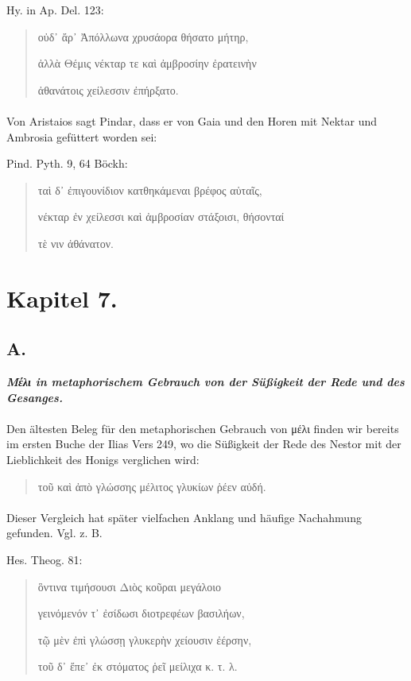 \documentclass[a4paper, 11pt, oneside]{article}
\begin{document}
Hy. in Ap. Del. 123:
\begin{quotation}\large
οὐδ᾽ ἄρ᾽ Ἀπόλλωνα χρυσάορα θήσατο μήτηρ,

ἀλλὰ Θέμις νέκταρ τε καὶ ἀμβροσίην ἐρατεινὴν

ἀθανάτοις χείλεσσιν ἐπήρξατο.
\end{quotation}
\paragraph{}
Von Aristaios sagt Pindar, dass er von Gaia und den Horen mit Nektar und Ambrosia gefüttert worden sei:

Pind. Pyth. 9, 64 Böckh:
\begin{quotation}\large
ταὶ δ᾽ ἐπιγουνίδιον κατθηκάμεναι βρέφος αὑταῖς,

νέκταρ ἐν χείλεσσι καὶ ἀμβροσίαν στάξοισι, θήσονταί

τὲ νιν ἀθάνατον.
\end{quotation}
\paragraph{}
\clearpage
\section{Kapitel 7.}
\subsection{A.}
\begin{center}
\textbf{\emph{Μέλι in metaphorischem Gebrauch von der Süßigkeit der Rede und des Gesanges.}}
\end{center}
\paragraph{}
Den ältesten Beleg für den metaphorischen Gebrauch von μέλι finden wir bereits im ersten Buche der Ilias Vers 249, wo die Süßigkeit der Rede des Nestor mit der Lieblichkeit des Honigs verglichen wird:
\begin{quotation}\large
τοῦ καὶ ἀπὸ γλώσσης μέλιτος γλυκίων ῥέεν αὐδή.
\end{quotation}
\paragraph{}
Dieser Vergleich hat später vielfachen Anklang und häufige Nachahmung gefunden. Vgl. z. B.

Hes. Theog. 81:
\begin{quotation}\large
ὃντινα τιμήσουσι Διὸς κοῦραι μεγάλοιο

γεινόμενόν τ᾽ ἐσίδωσι διοτρεφέων βασιλήων,

τῷ μὲν ἐπὶ γλώσσῃ γλυκερὴν χείουσιν ἐέρσην,

τοῦ δ᾽ ἔπε᾽ ἐκ στόματος ῥεῖ μείλιχα κ. τ. λ.
\end{quotation}
\end{document}
